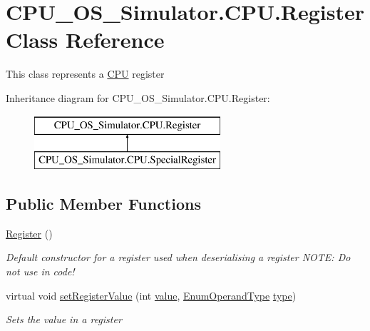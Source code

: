 \hypertarget{class_c_p_u___o_s___simulator_1_1_c_p_u_1_1_register}{}\section{C\+P\+U\+\_\+\+O\+S\+\_\+\+Simulator.\+C\+P\+U.\+Register Class Reference}
\label{class_c_p_u___o_s___simulator_1_1_c_p_u_1_1_register}


This class represents a \hyperlink{namespace_c_p_u___o_s___simulator_1_1_c_p_u}{C\+P\+U} register  


Inheritance diagram for C\+P\+U\+\_\+\+O\+S\+\_\+\+Simulator.\+C\+P\+U.\+Register\+:\begin{figure}[H]
\begin{center}
\leavevmode
\includegraphics[height=2.000000cm]{class_c_p_u___o_s___simulator_1_1_c_p_u_1_1_register}
\end{center}
\end{figure}
\subsection*{Public Member Functions}
\begin{DoxyCompactItemize}
\item 
\hyperlink{class_c_p_u___o_s___simulator_1_1_c_p_u_1_1_register_a1ee1fb682bf9349209b31a50aff2de45}{Register} ()
\begin{DoxyCompactList}\small\item\em Default constructor for a register used when deserialising a register N\+O\+T\+E\+: Do not use in code! \end{DoxyCompactList}\item 
virtual void \hyperlink{class_c_p_u___o_s___simulator_1_1_c_p_u_1_1_register_ad522f6440f47b38c73d266f2b23098e9}{set\+Register\+Value} (int \hyperlink{class_c_p_u___o_s___simulator_1_1_c_p_u_1_1_register_af2a05af808a3e2fa5fb086844cab1c2d}{value}, \hyperlink{namespace_c_p_u___o_s___simulator_1_1_c_p_u_ad49cfe442b74115a326c03b7ae848f76}{Enum\+Operand\+Type} \hyperlink{class_c_p_u___o_s___simulator_1_1_c_p_u_1_1_register_acb2f0f96db7cdee5c175562a5f050d83}{type})
\begin{DoxyCompactList}\small\item\em Sets the value in a register \end{DoxyCompactList}\end{DoxyCompactItemize}
